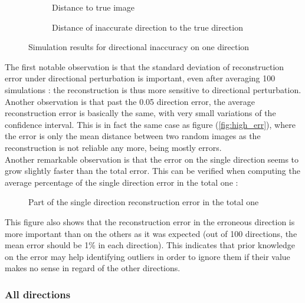 \documentclass[titlepage]{article}
\begin{document}
	\begin{figure}[H]
		\centering
		\begin{subfigure}{.5\textwidth}
			\centering
			
			\caption{Distance to true image}
		\end{subfigure}%
		\begin{subfigure}{.5\textwidth}
			\centering
			
			\caption{Distance of inaccurate direction to the true direction}
		\end{subfigure}
		\caption{Simulation results for directional inaccuracy on one direction}
	\end{figure}

	The first notable observation is that the standard deviation of reconstruction error under directional perturbation is important, even after averaging 100 simulations : the reconstruction is thus more sensitive to directional perturbation. Another observation is that past the 0.05 direction error, the average reconstruction error is basically the same, with very small variations of the confidence interval. This is in fact the same case as figure (\ref{fig:high_err}), where the error is only the mean distance between two random images as the reconstruction is not reliable any more, being mostly errors. \\
	
	Another remarkable observation is that the error on the single direction seems to grow slightly faster than the total error. This can be verified when computing the average percentage of the single direction error in the total one :
	
	\begin{figure}[H]
		\centering
		
		\caption{Part of the single direction reconstruction error in the total one}
	\end{figure}

	This figure also shows that the reconstruction error in the erroneous direction is more important than on the others as it was expected (out of 100 directions, the mean error should be 1\% in each direction). This indicates that prior knowledge on the error may help identifying outliers in order to ignore them if their value makes no sense in regard of the other directions.
	
	\subsubsection{All directions}
	
\end{document}
